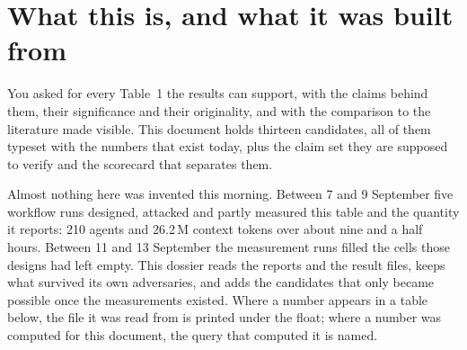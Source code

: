 \section{What this is, and what it was built from}

You asked for every Table~1 the results can support, with the claims behind them, their
significance and their originality, and with the comparison to the literature made visible. This
document holds thirteen candidates, all of them typeset with the numbers that exist today, plus
the claim set they are supposed to verify and the scorecard that separates them.

Almost nothing here was invented this morning. Between 7 and 9 September five workflow runs
designed, attacked and partly measured this table and the quantity it reports: 210 agents and
26.2\,M context tokens over about nine and a half hours. Between 11 and 13 September the
measurement runs filled the cells those designs had left empty. This dossier reads the reports and
the result files, keeps what survived its own adversaries, and adds the candidates that only became
possible once the measurements existed. Where a number appears in a table below, the file it was
read from is printed under the float; where a number was computed for this document, the query that
computed it is named.

\begin{center}\footnotesize
{}
\end{center}

